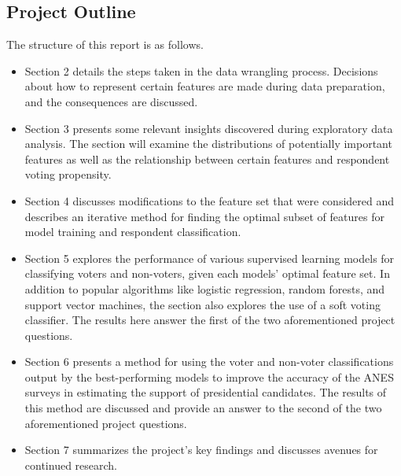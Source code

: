 \documentclass{article}
\begin{document}
	
	\subsection{Project Outline}
	
	The structure of this report is as follows.
	
	\begin{itemize}
		\item{Section 2 details the steps taken in the data wrangling process. Decisions about how to represent certain features are made during data preparation, and the consequences are discussed.}
		\item{Section 3 presents some relevant insights discovered during exploratory data analysis. The section will examine the distributions of potentially important features as well as the relationship between certain features and respondent voting propensity.}
		\item{Section 4 discusses modifications to the feature set that were considered and describes an iterative method for finding the optimal subset of features for model training and respondent classification.}
		\item{Section 5 explores the performance of various supervised learning models for classifying voters and non-voters, given each models' optimal feature set. In addition to popular algorithms like logistic regression, random forests, and support vector machines, the section also explores the use of a soft voting classifier. The results here answer the first of the two aforementioned project questions.}
		\item{Section 6 presents a method for using the voter and non-voter classifications output by the best-performing models to improve the accuracy of the ANES surveys in estimating the support of presidential candidates. The results of this method are discussed and provide an answer to the second of the two aforementioned project questions.}
		\item{Section 7 summarizes the project's key findings and discusses avenues for continued research.}
	\end{itemize}
\end{document}
